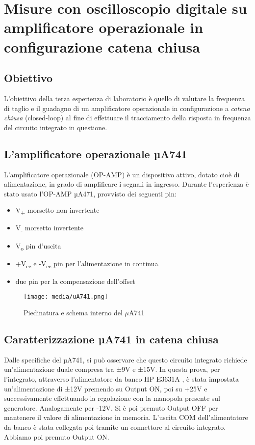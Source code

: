 \chapter{Misure con oscilloscopio digitale su amplificatore operazionale in configurazione catena chiusa}
\label{chap:terza_prova}

\section*{Obiettivo}
L'obiettivo della terza esperienza di laboratorio è quello di valutare la frequenza di taglio e il guadagno di un amplificatore operazionale in configurazione a \emph{catena chiusa} (closed-loop) al fine di effettuare il tracciamento della risposta in frequenza del circuito integrato in questione.

\section{L'amplificatore operazionale µA741}
L'amplificatore operazionale (OP-AMP) è un dispositivo attivo, dotato cioè di alimentazione, in grado  di amplificare i segnali in ingresso. Durante l'esperienza è stato usato l'OP-AMP µA471, provvisto dei seguenti pin:
\begin{itemize}
    \item V\textsubscript{+} morsetto non invertente
    \item V\textsubscript{-} morsetto invertente
    \item V\textsubscript{o} pin d'uscita
    \item +V\textsubscript{cc} e -V\textsubscript{cc} pin per l'alimentazione in continua
    \item due pin per la compensazione dell'offset
\end{itemize}

\begin{figure}
    \centering
    \texttt{[image: media/uA741.png]}
    \caption{Piedinatura e schema interno del $\mu$A741}
    \label{fig:Piedinatura e schema interno del uA741}
\end{figure}
\FloatBarrier
\section{Caratterizzazione µA741 in catena chiusa}
Dalle specifiche del µA741, si può osservare che questo circuito integrato richiede un’alimentazione duale compresa tra ±9V e ±15V. In questa prova, per l'integrato, attraverso l'alimentatore da banco HP E3631A , è stata impostata un'alimentazione di ±12V premendo su Output ON, poi  su +25V e successivamente effettuando la regolazione con la manopola presente sul generatore. Analogamente per -12V. 
Si è poi premuto Output OFF per mantenere il valore di alimentazione in memoria. L'uscita COM dell'alimentatore da banco è stata collegata poi tramite un connettore al circuito integrato. Abbiamo poi premuto Output ON. 

